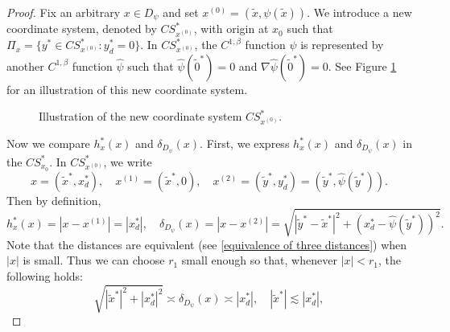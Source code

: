 \documentclass[12pt,a4paper]{amsart}
\numberwithin{equation}{section}
\theoremstyle{plain}
\newcommand{\wt}{\widetilde}
\newcommand{\1}{\mathbbm{1}}
\begin{document}
\begin{proof}
Fix an arbitrary $x \in D_{\psi}$ and set $x^{(0)} = (\widetilde{x}, \psi(\widetilde{x}))$. 
We introduce a new coordinate system, 
denoted by $CS_{x^{(0)}}^*$, with origin at $x_0$ such that $\Pi_x = \{ y^* \in CS_{x^{(0)}}^* : y_d^* = 0 \}$.
In $CS_{x^{(0)}}^*$, 
the $C^{1,\beta}$ function $\psi$ is represented by another $C^{1,\beta}$ function $\widehat{\psi}$ 
such that $\widehat{\psi}(\widetilde{0}^*) = 0$ and $\nabla \widehat{\psi}(\widetilde{0}^*) = 0$. See Figure \ref{figure2} for an illustration of this new coordinate system.
\begin{center}
\begin{figure}[H]
\caption{Illustration of the new coordinate system $CS_{x^{(0)}}^*$.}
\label{figure2}
\end{figure}
\end{center}
Now we compare $h_x^*(x)$ and $\delta_{D_{\psi}}(x)$. First, we express $h_x^*(x)$ and $\delta_{D_{\psi}}(x)$ in 
the $CS_{x_0}^*$. In $CS_{x^{(0)}}^*$, we write
\begin{equation}
x = (\wt{x}^*, x_d^*),\quad x^{(1)} = (\wt{x}^*, 0),\quad x^{(2)} = (\wt y^*,y_d^*) = (\wt y^*, \widehat{\psi}(\wt y^*)).
\end{equation}
Then by definition,
\begin{equation}
    h_x^*(x) = |x-x^{(1)}| = |x_d^*|,\quad \delta_{D_{\psi}}(x) = |x-x^{(2)}| = \sqrt{|\wt y^* - \wt x^*|^2 + (x_d^* - \widehat{\psi}(\wt y^*))^2}.
\end{equation}
Note that the distances are equivalent (see \eqref{equivalence of three distances}) 
when $|x|$ is small. 
Thus we can choose $r_1$ small enough so that, whenever \( |x| < r_1 \), the following holds:
\begin{equation}\label{e:elemfacts}
    \sqrt{|\wt x^*|^2 + |x_d^*|^2} \asymp \delta_{D_{\psi}}(x) \asymp |x_d^*|, \quad |\wt x^*| \lesssim |x_d^*|,

\end{equation}
\end{proof}
\end{document}

